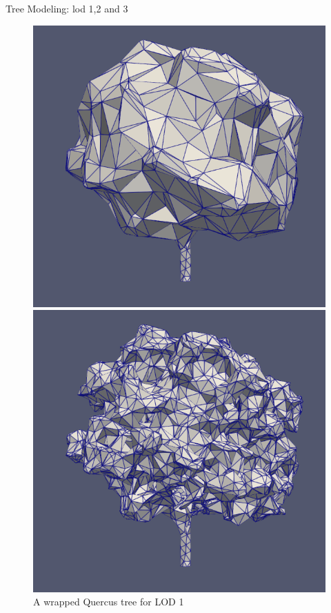 \documentclass[10pt]{beamer}
\begin{document}
\begin{frame}{Tree Modeling: lod 1,2 and 3}
	\begin{figure}[h]
		\centering
		\begin{minipage}{0.3\textwidth}
			\centering
			\includegraphics[width=\textwidth]{images/tree-round_lod1.png}
			\caption{A wrapped Quercus tree for LOD 1}
			\label{fig:figure1}
		\end{minipage}\hfill
		\begin{minipage}{0.3\textwidth}
			\centering
			\includegraphics[width=\textwidth]{images/tree-round_lod2.png}

\end{minipage}
\end{figure}
\end{frame}
\end{document}
